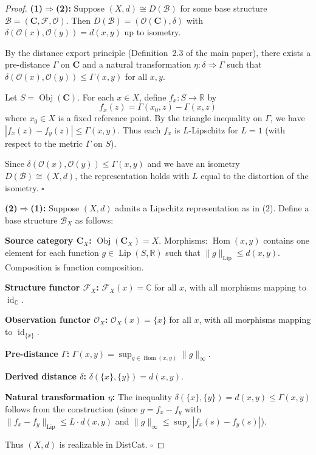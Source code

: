 \documentclass[11pt,a4paper]{article}
\begin{document}
\begin{proof}
\noindent\textbf{(1)$\Rightarrow$(2):} Suppose $(X,d)\cong D(\mathcal{B})$ for
some base structure $\mathcal{B}=(\mathbf{C},\mathcal{F},\mathcal{O})$.
Then $D(\mathcal{B})=(\mathcal{O}(\mathbf{C}),\delta)$ with
$\delta(\mathcal{O}(x),\mathcal{O}(y))=d(x,y)$ up to isometry.

By the distance export principle (Definition~2.3 of the main paper), there
exists a pre-distance $\Gamma$ on $\mathbf{C}$ and a natural transformation
$\eta:\delta\Rightarrow\Gamma$ such that
$\delta(\mathcal{O}(x),\mathcal{O}(y))\leq\Gamma(x,y)$ for all $x,y$.

Let $S=\operatorname{Obj}(\mathbf{C})$. For each $x\in X$, define
$f_x:S\to\mathbb{R}$ by
\begin{equation}
f_x(z)=\Gamma(x_0,z)-\Gamma(x,z)
\end{equation}
where $x_0\in X$ is a fixed reference point. By the triangle inequality on
$\Gamma$, we have $|f_x(z)-f_y(z)|\leq\Gamma(x,y)$. Thus each $f_x$ is
$L$-Lipschitz for $L=1$ (with respect to the metric $\Gamma$ on $S$).

Since $\delta(\mathcal{O}(x),\mathcal{O}(y))\leq\Gamma(x,y)$ and we have
an isometry $D(\mathcal{B})\cong(X,d)$, the representation holds with
$L$ equal to the distortion of the isometry. $\square$

\noindent\textbf{(2)$\Rightarrow$(1):} Suppose $(X,d)$ admits a Lipschitz
representation as in (2). Define a base structure $\mathcal{B}_X$ as
follows:

\noindent\textbf{Source category $\mathbf{C}_X$:} $\operatorname{Obj}(\mathbf{C}_X)=X$.
Morphisms: $\operatorname{Hom}(x,y)$ contains one element for each function
$g\in\operatorname{Lip}(S,\mathbb{R})$ such that
$\|g\|_{\mathrm{Lip}}\leq d(x,y)$. Composition is function composition.

\noindent\textbf{Structure functor $\mathcal{F}_X$:} $\mathcal{F}_X(x)=\mathbb{C}$ for
all $x$, with all morphisms mapping to $\operatorname{id}_{\mathbb{C}}$.

\noindent\textbf{Observation functor $\mathcal{O}_X$:} $\mathcal{O}_X(x)=\{x\}$ for
all $x$, with all morphisms mapping to $\operatorname{id}_{\{x\}}$.

\noindent\textbf{Pre-distance $\Gamma$:} $\Gamma(x,y)=\sup_{g\in\operatorname{Hom}(x,y)}\|g\|_\infty$.

\noindent\textbf{Derived distance $\delta$:} $\delta(\{x\},\{y\})=d(x,y)$.

\noindent\textbf{Natural transformation $\eta$:} The inequality
$\delta(\{x\},\{y\})=d(x,y)\leq\Gamma(x,y)$ follows from the
construction (since $g=f_x-f_y$ with $\|f_x-f_y\|_{\mathrm{Lip}}\leq L\cdot d(x,y)$
and $\|g\|_\infty\leq\sup_{s}|f_x(s)-f_y(s)|$).

Thus $(X,d)$ is realizable in DistCat. $\square$
\end{proof}
\end{document}
